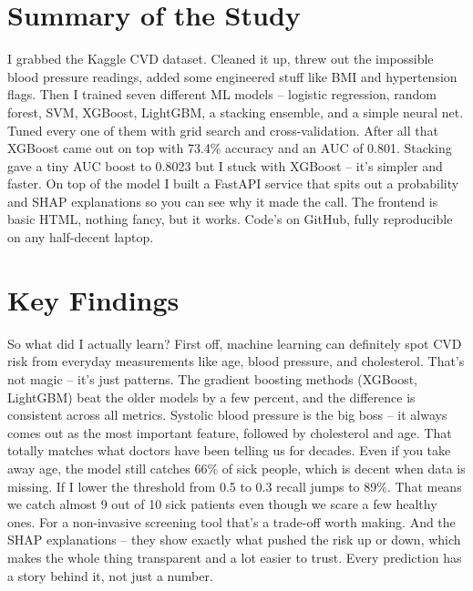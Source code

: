 \documentclass[12pt, a4paper, oneside]{book}
\begin{document}
\section{Summary of the Study}
I grabbed the Kaggle CVD dataset. Cleaned it up, threw out the impossible blood pressure readings, added some engineered stuff like BMI and hypertension flags. Then I trained seven different ML models -- logistic regression, random forest, SVM, XGBoost, LightGBM, a stacking ensemble, and a simple neural net. Tuned every one of them with grid search and cross-validation. After all that XGBoost came out on top with 73.4\% accuracy and an AUC of 0.801. Stacking gave a tiny AUC boost to 0.8023 but I stuck with XGBoost -- it's simpler and faster. On top of the model I built a FastAPI service that spits out a probability and SHAP explanations so you can see why it made the call. The frontend is basic HTML, nothing fancy, but it works. Code's on GitHub, fully reproducible on any half-decent laptop.

\section{Key Findings}
So what did I actually learn? First off, machine learning can definitely spot CVD risk from everyday measurements like age, blood pressure, and cholesterol. That's not magic -- it's just patterns. The gradient boosting methods (XGBoost, LightGBM) beat the older models by a few percent, and the difference is consistent across all metrics. Systolic blood pressure is the big boss -- it always comes out as the most important feature, followed by cholesterol and age. That totally matches what doctors have been telling us for decades. Even if you take away age, the model still catches 66\% of sick people, which is decent when data is missing. If I lower the threshold from 0.5 to 0.3 recall jumps to 89\%. That means we catch almost 9 out of 10 sick patients even though we scare a few healthy ones. For a non-invasive screening tool that's a trade-off worth making. And the SHAP explanations -- they show exactly what pushed the risk up or down, which makes the whole thing transparent and a lot easier to trust. Every prediction has a story behind it, not just a number.
\end{document}
